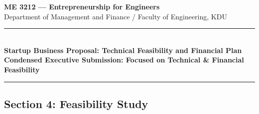 \documentclass[10.5pt,a4paper]{article}
\begin{document}
\begin{center}
    {\large \textbf{ME 3212 — Entrepreneurship for Engineers}}\\[0.1em]
    {\normalsize Department of Management and Finance / Faculty of Engineering, KDU}\\[0.2em]
    \rule{\textwidth}{0.8pt}\\[0.15em]
    {\Large \textbf{Startup Business Proposal: Technical Feasibility and Financial Plan}}\\[0.1em]
    {\small \textbf{Condensed Executive Submission: Focused on Technical \& Financial Feasibility}}\\[0.15em]
    \rule{\textwidth}{0.4pt}
\end{center}
\vspace{-0.3em}

\subsection*{Section 4: Feasibility Study}
\end{document}
